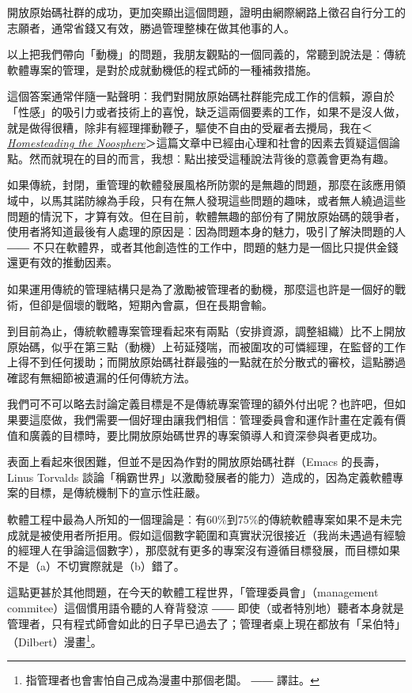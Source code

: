 \documentclass[12pt, a5paper]{book}
\begin{document}
開放原始碼社群的成功，更加突顯出這個問題，證明由網際網路上徵召自行分工的志願者，通常省錢又有效，勝過管理整棟在做其他事的人。

以上把我們帶向「動機」的問題，我朋友觀點的一個同義的，常聽到說法是︰傳統軟體專案的管理，是對於成就動機低的程式師的一種補救措施。

這個答案通常伴隨一點聲明︰我們對開放原始碼社群能完成工作的信賴，源自於「性感」的吸引力或者技術上的喜悅，缺乏這兩個要素的工作，如果不是沒人做，就是做得很糟，除非有經理揮動鞭子，驅使不自由的受雇者去攪局，我在＜\href{http://www.tuxedo.org/~esr/magic-cauldron/}{\emph{Homesteading
the
Noosphere}}＞這篇文章中已經由心理和社會的因素去質疑這個論點。然而就現在的目的而言，我想︰點出接受這種說法背後的意義會更為有趣。

如果傳統，封閉，重管理的軟體發展風格所防禦的是無趣的問題，那麼在該應用領域中，以馬其諾防線為手段，只有在無人發現這些問題的趣味，或者無人繞過這些問題的情況下，才算有效。但在目前，軟體無趣的部份有了開放原始碼的競爭者，使用者將知道最後有人處理的原因是︰因為問題本身的魅力，吸引了解決問題的人
――
不只在軟體界，或者其他創造性的工作中，問題的魅力是一個比只提供金錢還更有效的推動因素。

如果運用傳統的管理結構只是為了激勵被管理者的動機，那麼這也許是一個好的戰術，但卻是個壞的戰略，短期內會贏，但在長期會輸。

到目前為止，傳統軟體專案管理看起來有兩點（安排資源，調整組織）比不上開放原始碼，似乎在第三點（動機）上茍延殘喘，而被圍攻的可憐經理，在監督的工作上得不到任何援助；而開放原始碼社群最強的一點就在於分散式的審校，這點勝過確認有無細節被遺漏的任何傳統方法。

我們可不可以略去討論定義目標是不是傳統專案管理的額外付出呢？也許吧，但如果要這麼做，我們需要一個好理由讓我們相信︰管理委員會和運作計畫在定義有價值和廣義的目標時，要比開放原始碼世界的專案領導人和資深參與者更成功。

表面上看起來很困難，但並不是因為作對的開放原始碼社群（Emacs
的長壽，Linus Torvalds
談論「稱霸世界」以激勵發展者的能力）造成的，因為定義軟體專案的目標，是傳統機制下的宣示性莊嚴。

軟體工程中最為人所知的一個理論是︰有60\%到75\%的傳統軟體專案如果不是未完成就是被使用者所拒用。假如這個數字範圍和真實狀況很接近（我尚未遇過有經驗的經理人在爭論這個數字），那麼就有更多的專案沒有遵循目標發展，而目標如果不是（a）不切實際就是（b）錯了。

這點更甚於其他問題，在今天的軟體工程世界，「管理委員會」（management
commitee）這個慣用語令聽的人脊背發涼 ――
即使（或者特別地）聽者本身就是管理者，只有程式師會如此的日子早已過去了；管理者桌上現在都放有「呆伯特」（Dilbert）漫畫\footnote{指管理者也會害怕自己成為漫畫中那個老闆。
  ―― 譯註。}。
\end{document}
